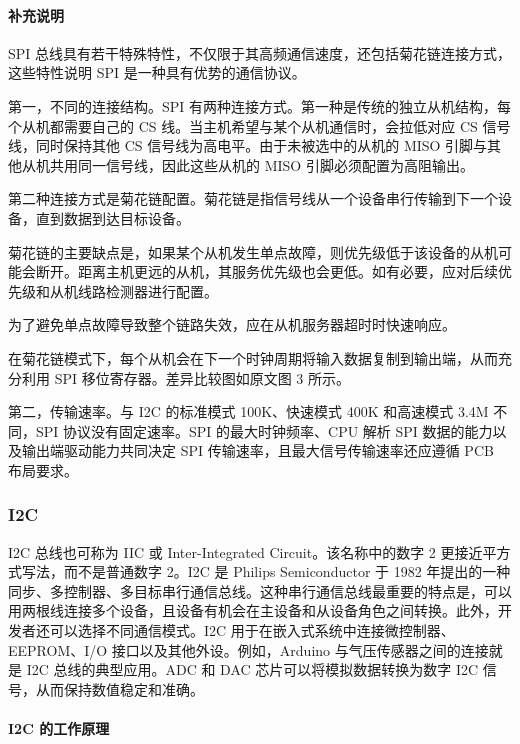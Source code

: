 \documentclass[12pt,a4paper]{article}
\numberwithin{equation}{section}
\begin{document}
\paragraph{补充说明}

SPI 总线具有若干特殊特性，不仅限于其高频通信速度，还包括菊花链连接方式，这些特性说明 SPI 是一种具有优势的通信协议。

第一，不同的连接结构。SPI 有两种连接方式。第一种是传统的独立从机结构，每个从机都需要自己的 CS 线。当主机希望与某个从机通信时，会拉低对应 CS 信号线，同时保持其他 CS 信号线为高电平。由于未被选中的从机的 MISO 引脚与其他从机共用同一信号线，因此这些从机的 MISO 引脚必须配置为高阻输出。

第二种连接方式是菊花链配置。菊花链是指信号线从一个设备串行传输到下一个设备，直到数据到达目标设备。

菊花链的主要缺点是，如果某个从机发生单点故障，则优先级低于该设备的从机可能会断开。距离主机更远的从机，其服务优先级也会更低。如有必要，应对后续优先级和从机线路检测器进行配置。

为了避免单点故障导致整个链路失效，应在从机服务器超时时快速响应。

在菊花链模式下，每个从机会在下一个时钟周期将输入数据复制到输出端，从而充分利用 SPI 移位寄存器。差异比较图如原文图 3 所示。

第二，传输速率。与 I2C 的标准模式 100K、快速模式 400K 和高速模式 3.4M 不同，SPI 协议没有固定速率。SPI 的最大时钟频率、CPU 解析 SPI 数据的能力以及输出端驱动能力共同决定 SPI 传输速率，且最大信号传输速率还应遵循 PCB 布局要求。

\subsubsection*{I2C}

I2C 总线也可称为 IIC 或 Inter-Integrated Circuit。该名称中的数字 2 更接近平方式写法，而不是普通数字 2。I2C 是 Philips Semiconductor 于 1982 年提出的一种同步、多控制器、多目标串行通信总线。这种串行通信总线最重要的特点是，可以用两根线连接多个设备，且设备有机会在主设备和从设备角色之间转换。此外，开发者还可以选择不同通信模式。I2C 用于在嵌入式系统中连接微控制器、EEPROM、I/O 接口以及其他外设。例如，Arduino 与气压传感器之间的连接就是 I2C 总线的典型应用。ADC 和 DAC 芯片可以将模拟数据转换为数字 I2C 信号，从而保持数值稳定和准确。

\paragraph{I2C 的工作原理}
\end{document}
